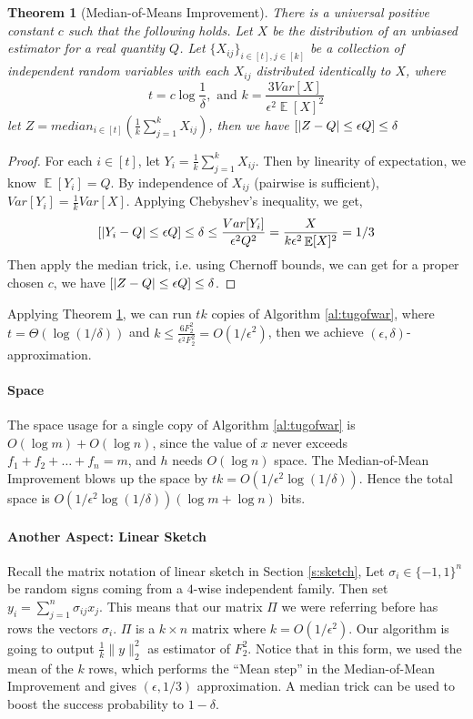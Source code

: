 \documentclass[11pt]{article}
\theoremstyle{plain}
\newtheorem{theorem}{Theorem}[section]
\DeclareMathOperator*{\E}{\mathbb{E}}
\let\Pr\relax
\DeclareMathOperator*{\Pr}{\mathbb{P}}
\begin{document}
\begin{theorem}[Median-of-Means Improvement]
\label{th:medianofmean}
There is a universal positive constant $c$ such that the following holds. Let 
$X$ be the distribution of an unbiased estimator for a real quantity $Q$. Let 
$\{X_{ij}\}_{i\in[t], j\in[k]}$ be a collection of independent random variables 
with each $X_{ij}$ distributed identically to $X$, where
\[
t=c\log \frac{1}{\delta}, \text{ and } k=\frac{3Var[X]}{\epsilon^2\E[X]^2}
\]
let $Z=median_{i \in [t]}(\frac{1}{k}\sum_{j=1}^k X_{ij})$, then we have 
$\Pr[|Z-Q|\leq \epsilon Q]\leq\delta$
\end{theorem}
\begin{proof}
For each $i\in[t]$, let $Y_i=\frac{1}{k}\sum_{j=1}^k X_{ij}$. Then by linearity of 
expectation, we know $\E[Y_i]=Q$. By independence of $X_{ij}$ (pairwise is 
sufficient), $Var[Y_i]=\frac{1}{k}Var[X]$. Applying Chebyshev’s inequality, we 
get, \[
\Pr[|Y_i-Q|\leq \epsilon Q]\leq\delta\leq 
\frac{Var[Y_i]}{\epsilon^2Q^2}=\frac{X}{k\epsilon^2\E[X]^2}=1/3
\]
Then apply the median trick, i.e. using Chernoff bounds, we can get for a 
proper chosen $c$, we have $\Pr[|Z-Q|\leq \epsilon Q]\leq\delta$. 
\end{proof}

Applying Theorem \ref{th:medianofmean}, we can run $tk$ copies of 
Algorithm \ref{al:tugofwar}, where $t=\Theta(\log(1/\delta))$ and 
$k\leq\frac{6F_2^2}{\epsilon^2F_2^2}=O(1/\epsilon^2)$, then we achieve 
$(\epsilon, \delta)$-approximation. 

\paragraph{Space}The space usage for a single copy of Algorithm 
\ref{al:tugofwar} is $O(\log m)+O(\log n)$, since the value of $x$ never 
exceeds $f_1+f_2+\dots+f_n=m$, and $h$ needs $O(\log n)$ space. The 
Median-of-Mean Improvement blows up the space by 
$tk=O(1/\epsilon^2\log(1/\delta))$. Hence the total space is 
$O(1/\epsilon^2\log(1/\delta))(\log m + \log n)$ bits. 

\paragraph{Another Aspect: Linear Sketch} Recall the matrix notation of 
linear sketch in Section \ref{s:sketch}, Let $\sigma_i \in \{-1,1\}^n$ be random 
signs coming from a $4$-wise independent family. Then set $y_i= 
\sum_{j=1}^n \sigma_{ij} x_{j}$. This means that our matrix $\Pi$ we were 
referring before has rows the vectors $\sigma_i$. $\Pi$ is a $k\times n$ 
matrix where $k=O(1/\epsilon^2)$. Our algorithm is going to 
output $\frac{1}{k} \|y\|_2^2$ as estimator of $F_2^2$. Notice that in this 
form, we used the mean of the $k$ rows, which performs the ``Mean step'' 
in the Median-of-Mean Improvement and gives $(\epsilon, 1/3)$ 
approximation. A median trick can be used to boost the success probability 
to $1-\delta$. 
\end{document}
